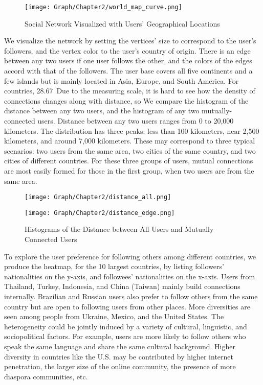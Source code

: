 \begin{figure} \centering
  \caption{Social Network Visualized with Users' Geographical Locations}
  \texttt{[image: Graph/Chapter2/world\_map\_curve.png]}
\end{figure}

We visualize the network by setting the vertices' size to correspond to the user's followers, and the vertex color to the user’s country of origin. There is an edge between any two users if one user follows the other, and the colors of the edges accord with that of the followers. The user base covers all five continents and a few islands but is mainly located in Asia, Europe, and South America. For countries, 28.67\
Due to the measuring scale, it is hard to see how the density of connections changes along with distance, so We compare the histogram of the distance between any two users, and the histogram of any two mutually-connected users. Distance between any two users ranges from 0 to 20,000 kilometers. The distribution has three peaks: less than 100 kilometers, near 2,500 kilometers, and around 7,000 kilometers. These may correspond to three typical scenarios: two users from the same area, two cities of the same country, and two cities of different countries. For these three groups of users, mutual connections are most easily formed for those in the first group, when two users are from the same area.

\begin{figure} \centering
  \caption{Histograms of the Distance between All Users and Mutually Connected Users}
  \begin{minipage}[t]{0.45\textwidth}
    \centering
    \texttt{[image: Graph/Chapter2/distance\_all.png]}
  \end{minipage}
  \begin{minipage}[t]{0.45\textwidth} \centering
    \texttt{[image: Graph/Chapter2/distance\_edge.png]}
  \end{minipage}
\end{figure}

To explore the user preference for following others among different countries, we produce the heatmap, for the 10 largest countries, by listing followers' nationalities on the y-axis, and followees' nationalities on the x-axis. Users from Thailand, Turkey, Indonesia, and China (Taiwan) mainly build connections internally. Brazilian and Russian users also prefer to follow others from the same country but are open to following users from other places. More diversities are seen among people from Ukraine, Mexico, and the United States. The heterogeneity could be jointly induced by a variety of cultural, linguistic, and sociopolitical factors. For example, users are more likely to follow others who speak the same language and share the same cultural background. Higher diversity in countries like the U.S. may be contributed by higher internet penetration, the larger size of the online community, the presence of more diaspora communities, etc.

